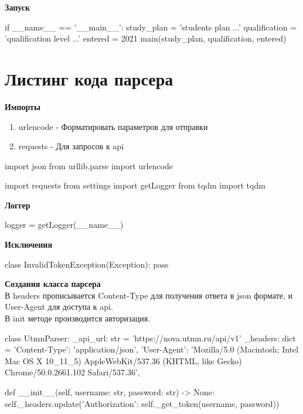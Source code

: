 \documentclass[a4paper,12pt]{article} %
\begin{document}
\textbf{Запуск}
\begin{python}
if __name__ == '__main__':
    study_plan = 'students plan ...'
    qualification = 'qualification level ...'
    entered = 2021
    main(study_plan, qualification, entered)
    
\end{python}

\newpage

\section{Листинг кода парсера}
\textbf{Импорты}
\begin{enumerate}
    \item urlencode - Форматировать параметров для отправки
    \item requests - Для запросов к api
\end{enumerate}
\begin{python}
import json
from urllib.parse import urlencode

import requests
from settings import getLogger
from tqdm import tqdm
\end{python}


\textbf{Логгер}
\begin{python}
logger = getLogger(__name__)
\end{python}


\textbf{Исключения}
\begin{python}
class InvalidTokenException(Exception):
    pass
\end{python}


\textbf{Создания класса парсера}\\
В headers прописывается Content-Type для получения ответа в json формате, и User-Agent для доступа к api.\\
В init методе производится авторизация.
\begin{python}
class UtmnParser:
    _api_url: str = 'https://nova.utmn.ru/api/v1'
    _headers: dict = {
        'Content-Type': 'application/json',
        'User-Agent': 'Mozilla/5.0 (Macintosh; Intel Mac OS X 10_11_5) AppleWebKit/537.36 (KHTML, like Gecko) Chrome/50.0.2661.102 Safari/537.36',
    }

    def __init__(self, username: str, password: str) -> None:
        self._headers.update({'Authorization': self._get_token(username, password)})
\end{python}
\end{document}
